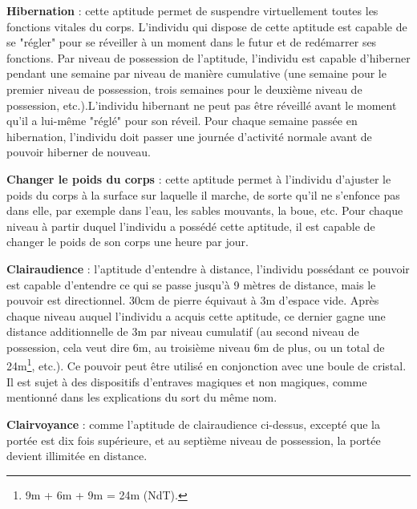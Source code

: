 \documentclass[11pt]{article}
\begin{document}
{\bigskip

\textbf{Hibernation} : cette aptitude permet de suspendre virtuellement toutes les fonctions vitales du corps. L'individu qui dispose de cette aptitude est capable de se "régler" pour se réveiller à un moment dans le futur et de redémarrer ses fonctions. Par niveau de possession de l'aptitude, l'individu est capable d'hiberner pendant une semaine par niveau de manière cumulative (une semaine pour le premier niveau de possession, trois semaines pour le deuxième niveau de possession, etc.).L'individu hibernant ne peut pas être réveillé avant le moment qu'il a lui-même "réglé" pour son réveil. Pour chaque semaine passée en hibernation, l'individu doit passer une journée d'activité normale avant de pouvoir hiberner de nouveau.

\bigskip

\textbf{Changer le poids du corps} : cette aptitude permet à l'individu d'ajuster le poids du corps à la surface sur laquelle il marche, de sorte qu'il ne s'enfonce pas dans elle, par exemple dans l'eau, les sables mouvants, la boue, etc. Pour chaque niveau à partir duquel l'individu a possédé cette aptitude, il est capable de changer le poids de son corps une heure par jour.

\bigskip

\textbf{Clairaudience} : l'aptitude d'entendre à distance, l'individu possédant ce pouvoir est capable d'entendre ce qui se passe jusqu'à 9 mètres de distance, mais le pouvoir est directionnel. 30cm de pierre équivaut à 3m d'espace vide. Après chaque niveau auquel l'individu a acquis cette aptitude, ce dernier gagne une distance additionnelle de 3m par niveau cumulatif (au second niveau de possession, cela veut dire 6m, au troisième niveau 6m de plus, ou un total de 24m\footnote{9m + 6m + 9m = 24m (NdT).}, etc.). Ce pouvoir peut être utilisé en conjonction avec une boule de cristal. Il est sujet à des dispositifs d'entraves magiques et non magiques, comme mentionné dans les explications du sort du même nom.

\bigskip

\textbf{Clairvoyance} : comme l'aptitude de clairaudience ci-dessus, excepté que la portée est dix fois supérieure, et au septième niveau de possession, la portée devient illimitée en distance.

\bigskip

}
\end{document}
